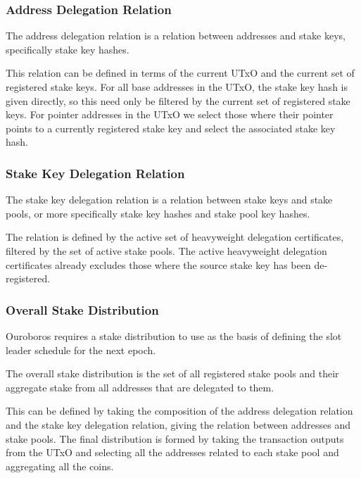 \documentclass[11pt,a4paper]{article}
\begin{document}
\subsubsection{Address Delegation Relation}
\label{address-delegation-relation}

The address delegation relation is a relation between addresses and
stake keys, specifically stake key hashes.

This relation can be defined in terms of the current UTxO and the
current set of registered stake keys. For all base addresses in the
UTxO, the stake key hash is given directly, so this need only be
filtered by the current set of registered stake keys. For pointer
addresses in the UTxO we select those where their pointer points to a
currently registered stake key and select the associated stake key hash.

\subsubsection{Stake Key Delegation Relation}
\label{stake-key-delegation-relation}

The stake key delegation relation is a relation between stake keys and
stake pools, or more specifically stake key hashes and stake pool key
hashes.

The relation is defined by the active set of heavyweight delegation
certificates, filtered by the set of active stake pools. The active
heavyweight delegation certificates already excludes those where the
source stake key has been de-registered.

\subsubsection{Overall Stake Distribution}
\label{overall-stake-distribution}

Ouroboros \citep{ouroboros_classic} requires a stake distribution to
use as the basis of defining the slot leader schedule for the next
epoch.

The overall stake distribution is the set of all registered stake pools
and their aggregate stake from all addresses that are delegated to them.

This can be defined by taking the composition of the address delegation
relation and the stake key delegation relation, giving the relation
between addresses and stake pools. The final distribution is formed by
taking the transaction outputs from the UTxO and selecting all the
addresses related to each stake pool and aggregating all the coins.
\end{document}
